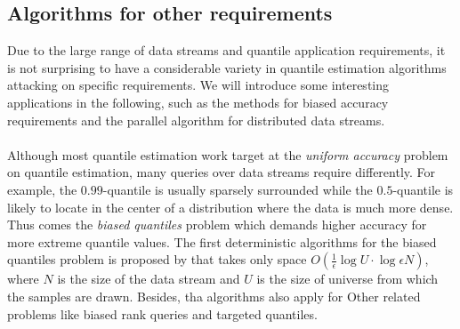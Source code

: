 \subsection{Algorithms for other requirements}
\label{other}
Due to the large range of data streams and quantile application requirements, it is not surprising to have a considerable variety in quantile estimation algorithms attacking on specific requirements. We will introduce some interesting applications in the following, such as the methods for biased accuracy requirements and the parallel algorithm for distributed data streams.
\\\\
Although most quantile estimation work target at the \textit{uniform accuracy} problem on quantile estimation, many queries over data streams require differently. For example, the $0.99$-quantile is usually sparsely surrounded while the $0.5$-quantile is likely to locate in the center of a distribution where the data is much more dense. Thus comes the \textit{biased quantiles} problem which demands higher accuracy for more extreme quantile values.
The first deterministic algorithms for the biased quantiles problem is proposed by \citeauthor{cormodeSpaceTimeefficientDeterministic2006} \cite{cormodeSpaceTimeefficientDeterministic2006} that takes only space $O(\frac{1}{\epsilon} \log {U} \cdot \log {\epsilon N})$, where $N$ is the size of the data stream and $U$ is the size of universe from which the samples are drawn. Besides, tha algorithms also apply for Other related problems like biased rank queries and targeted quantiles. 

